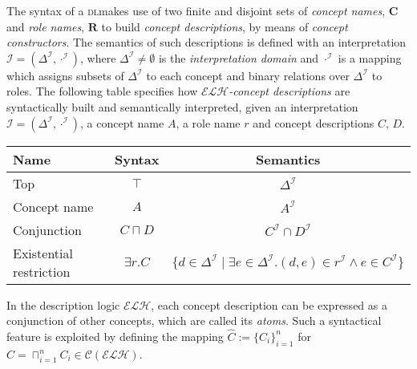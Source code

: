 \documentclass[]{llncs}
\newcommand{\elh}{\(\mathcal{ELH}{}\)}
\newcommand{\DeltaI}{\Delta^\mathcal{I}}
\newcommand{\dotI}{\cdot^{\mathcal{I}}}
\newcommand{\dl}{\textsc{dl}}
\begin{document}
  The syntax of a \dl makes use of two finite and disjoint sets of \emph{concept names}, \(\mathbf{C}\) and \emph{role names}, \(\mathbf{R}\) to build \emph{concept descriptions}, by means of \emph{concept constructors}.
  The semantics of such descriptions is defined with an interpretation \(\mathcal{I} = (\DeltaI,\dotI)\), where \(\DeltaI \ne \emptyset\) is the \emph{interpretation domain} and \(\dotI\) is a mapping which assigns subsets of \(\DeltaI{}\) to each concept and binary relations over \(\DeltaI\) to roles.
  The following table specifies how \emph{\elh-concept descriptions} are syntactically built and semantically interpreted, given an interpretation \(\mathcal{I} = (\DeltaI,\dotI)\), a concept name \(A\), a role name \(r\) and concept descriptions \(C\), \(D\).
  \begin{center}
    \begin{tabular}{lcc}
      \toprule
      Name & Syntax & Semantics \\
      \midrule
      Top & \(\top\) & \(\DeltaI\) \\
      Concept name & \(A\) & \(A^\mathcal{I}\) \\
      Conjunction & \(C \sqcap D\) & \(C^\mathcal{I} \cap D^\mathcal{I}\) \\
      Existential restriction & \(\exists{}r.C\) &
      \(\lbrace d \in \DeltaI \mid \exists e \in \DeltaI.
      (d,e) \in r^\mathcal{I} \land e \in C^\mathcal{I} \rbrace\) \\
      \bottomrule
    \end{tabular}
  \end{center}

  In the description logic \elh{}, each concept description can be expressed as a conjunction of other concepts, which are called its \emph{atoms}.
  Such a syntactical feature is exploited by defining the mapping
  \(\widehat{C} := \lbrace C_i\rbrace_{i=1}^n\) for
  \(C = \sqcap_{i=1}^n C_i \in \mathcal{C}(\mathcal{ELH})\).
\end{document}
